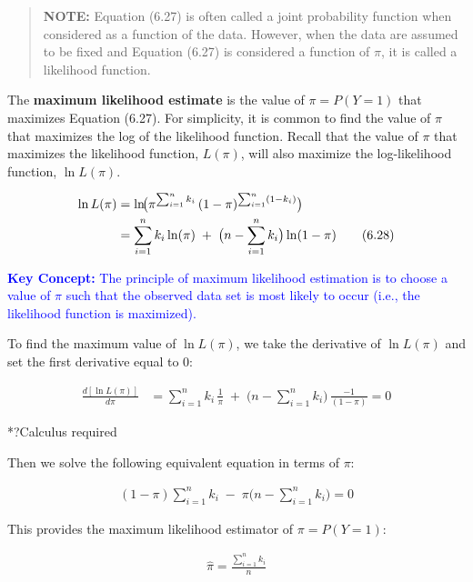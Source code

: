 \documentclass[
]{book}
\begin{document}
\begin{quote}
\textbf{NOTE:} Equation (6.27) is often called a joint probability function when considered as a function of the data. However, when the data are assumed to be fixed and Equation (6.27) is considered a function of \(\pi\), it is called a likelihood function.
\end{quote}

The \textbf{maximum likelihood estimate} is the value of \(\pi = P(Y = 1)\) that maximizes Equation (6.27). For simplicity, it is common to find the value of \(\pi\) that maximizes the log of the likelihood function. Recall that the value of \(\pi\) that maximizes the likelihood function, \(L(\pi)\), will also maximize the log-likelihood function, \(\ln L(\pi)\).

\begin{align}
\ln L(\pi)
&= \ln\!\bigl(\pi^{\sum_{i=1}^n k_i}\,(1 - \pi)^{\sum_{i=1}^n (1 - k_i)}\bigr) \notag \\
&= \sum_{i=1}^n k_i \ln(\pi)\;+\;\bigl(n - \sum_{i=1}^n k_i\bigr)\ln(1 - \pi)
\tag{6.28}
\end{align}

\textbf{\textcolor{blue}{Key Concept:}}
\textcolor{blue}{The principle of maximum likelihood estimation is to choose a value of $\pi$ such that the observed data set is most likely to occur (i.e., the likelihood function is maximized). }

To find the maximum value of \(\ln L(\pi)\), we take the derivative of \(\ln L(\pi)\) and set the first derivative equal to 0:

\begin{align}
\frac{d[\ln L(\pi)]}{d\pi}
&= \sum_{i=1}^n k_i \,\frac{1}{\pi} \;+\;\bigl(n - \sum_{i=1}^n k_i\bigr)\,\frac{-1}{(1 - \pi)} = 0
\tag{6.29}
\end{align}

*?Calculus required

Then we solve the following equivalent equation in terms of \(\pi\):

\begin{align}
(1 - \pi)\sum_{i=1}^n k_i \;-\;\pi\bigl(n - \sum_{i=1}^n k_i\bigr) = 0
\tag{6.30}
\end{align}

This provides the maximum likelihood estimator of \(\pi = P(Y = 1)\):

\begin{align}
\displaystyle \hat{\pi} = \frac{\sum_{i=1}^n k_i}{n}
\tag{6.31}
\end{align}
\end{document}
